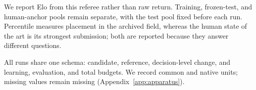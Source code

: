 %
%
%
We report Elo from this referee rather than raw return. Training, frozen-test, and
human-anchor pools remain separate, with the test pool fixed before each run. Percentile
measures placement in the archived field, whereas the human state of the art is its
strongest submission; both are reported because they answer different questions.

All runs share one schema: candidate, reference, decision-level change, and learning,
evaluation, and total budgets. We record common and native units; missing values remain
missing (Appendix~\ref{app:apparatus}).

